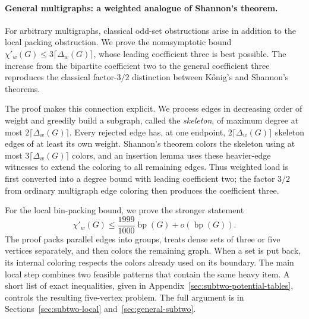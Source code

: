 \documentclass[11pt]{article}
\theoremstyle{definition}\newtheorem{algorithm}{Algorithm}[section]
\numberwithin{equation}{section}
\theoremstyle{remark}\newtheorem*{remark}{Remark}
\newcommand{\bp}{\operatorname{bp}}
\newcommand{\dw}{\Delta_w}
\newcommand{\cw}{\chi'_w}
\begin{document}
\paragraph{General multigraphs: a weighted analogue of Shannon's theorem.}
For arbitrary multigraphs, classical odd-set obstructions arise in
addition to the local packing obstruction. We prove the nonasymptotic
bound $\cw(G)\le3\lceil\dw(G)\rceil$,
whose leading coefficient three is best possible. The increase from the
bipartite coefficient two to the general coefficient three reproduces
the classical factor-$3/2$ distinction between K\H{o}nig's and Shannon's
theorems.
 


The proof makes this connection explicit. We process edges in decreasing
order of weight and greedily build a subgraph, called the
\emph{skeleton}, of maximum degree at most $2\lceil\dw(G)\rceil$.
Every rejected edge has, at one endpoint, $2\lceil\dw(G)\rceil$
skeleton edges of at least its own weight. Shannon's theorem colors the
skeleton using at most $3\lceil\dw(G)\rceil$ colors, and an insertion
lemma uses these heavier-edge witnesses to extend the coloring to all
remaining edges. Thus weighted load is first converted into a degree
bound with leading coefficient two; the factor $3/2$ from ordinary
multigraph edge coloring then produces the coefficient three.

For the local bin-packing bound, we prove the stronger statement
\[
 \chi'_w(G)\le\frac{1999}{1000}\bp(G)+o(\bp(G)).
\]
The proof packs parallel edges into groups, treats dense sets of three
or five vertices separately, and then colors the remaining graph.
When a set is put back, its internal coloring respects the colors
already used on its boundary. The main local step combines two
feasible patterns that contain the same heavy item. A short list of
exact inequalities, given in Appendix~\ref{sec:subtwo-potential-tables},
controls the resulting five-vertex problem. The full argument is in
Sections~\ref{sec:subtwo-local} and~\ref{sec:general-subtwo}.
\end{document}
